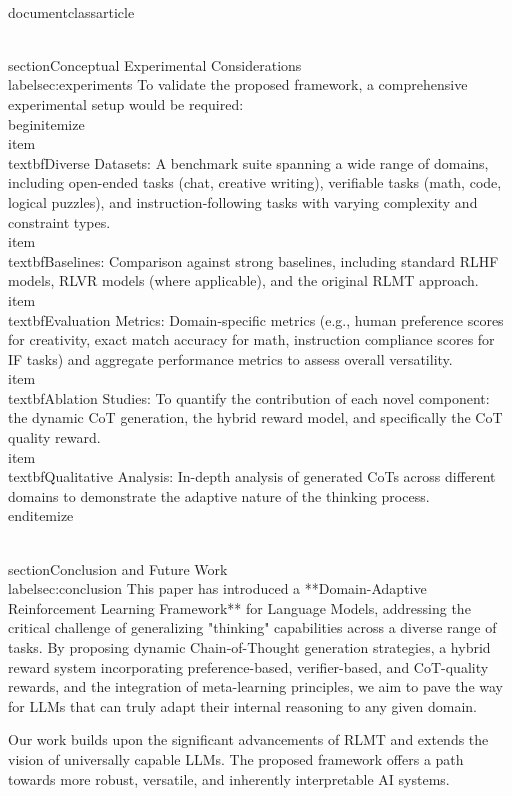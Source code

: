 \\documentclass{article}
\begin{document}
\\section{Conceptual Experimental Considerations}
\\label{sec:experiments}
To validate the proposed framework, a comprehensive experimental setup would be required:
\\begin{itemize}
    \\item \\textbf{Diverse Datasets:} A benchmark suite spanning a wide range of domains, including open-ended tasks (chat, creative writing), verifiable tasks (math, code, logical puzzles), and instruction-following tasks with varying complexity and constraint types.
    \\item \\textbf{Baselines:} Comparison against strong baselines, including standard RLHF models, RLVR models (where applicable), and the original RLMT approach.
    \\item \\textbf{Evaluation Metrics:} Domain-specific metrics (e.g., human preference scores for creativity, exact match accuracy for math, instruction compliance scores for IF tasks) and aggregate performance metrics to assess overall versatility.
    \\item \\textbf{Ablation Studies:} To quantify the contribution of each novel component: the dynamic CoT generation, the hybrid reward model, and specifically the CoT quality reward.
    \\item \\textbf{Qualitative Analysis:} In-depth analysis of generated CoTs across different domains to demonstrate the adaptive nature of the thinking process.
\\end{itemize}

\\section{Conclusion and Future Work}
\\label{sec:conclusion}
This paper has introduced a **Domain-Adaptive Reinforcement Learning Framework** for Language Models, addressing the critical challenge of generalizing "thinking" capabilities across a diverse range of tasks. By proposing dynamic Chain-of-Thought generation strategies, a hybrid reward system incorporating preference-based, verifier-based, and CoT-quality rewards, and the integration of meta-learning principles, we aim to pave the way for LLMs that can truly adapt their internal reasoning to any given domain.

Our work builds upon the significant advancements of RLMT \cite{bhaskar2025language} and extends the vision of universally capable LLMs. The proposed framework offers a path towards more robust, versatile, and inherently interpretable AI systems.
\end{document}

